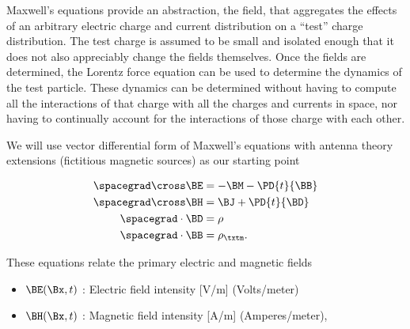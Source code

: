 %
%
Maxwell's equations provide an abstraction, the field, that aggregates the effects of an arbitrary electric charge and current
distribution on a ``test'' charge distribution.
The test charge is assumed to be small and isolated enough that it does not also appreciably change the fields themselves.
Once the fields are determined, the Lorentz force equation can be used to determine the dynamics of the
test particle.
These dynamics can be determined without having to
compute all the interactions of that charge with all the charges and currents in space, nor having to continually account for
the interactions of those charge with each other.

We will use vector differential form of Maxwell's equations with antenna theory extensions (fictitious magnetic sources) as our starting point


\index{\(\BE\)}
\index{\(\BH\)}
\index{\(\BB\)}
\index{\(\BD\)}
\index{\(\BM\)}
\index{\(\BJ\)}
\index{\(\rho\)}
\index{\(\rho_\txtm\)}

\begin{equation}\label{eqn:freespace:3399}
\begin{aligned}
\spacegrad \cross \BE &= - \BM - \PD{t}{\BB} \\
\spacegrad \cross \BH &= \BJ + \PD{t}{\BD} \\
\spacegrad \cdot \BD &= \rho \\
\spacegrad \cdot \BB &= \rho_\txtm.
\end{aligned}
\end{equation}

These equations relate the primary electric and magnetic fields

\begin{itemize}
	\item \( \BE(\Bx, t) \) : Electric field intensity [\si{V/m}] (Volts/meter)
	\item \( \BH(\Bx, t) \) : Magnetic field intensity [\si{A/m}] (Amperes/meter),
\end{itemize}


